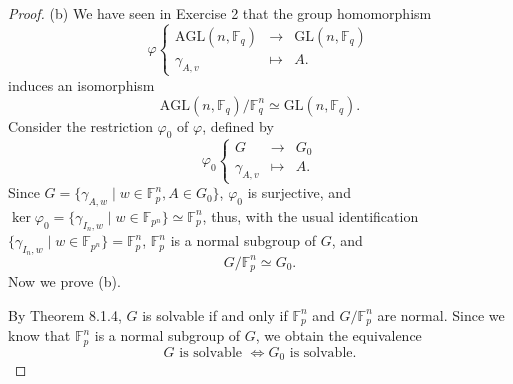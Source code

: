\documentclass[11pt,a4paper]{article}
\newcommand{\F}{\mathbb{F}}
\begin{document}
\begin{proof}
  \item[(b)] We have seen in Exercise 2 that the group homomorphism
  $$
\varphi
\left\{
\begin{array}{ccc}
\mathrm{AGL}(n,\F_q) & \to &\mathrm{GL}(n,\F_q)\\
\gamma_{A,v} & \mapsto &A.
\end{array}
\right.
$$
induces an isomorphism 
$$\mathrm{AGL}(n,\F_q)/ \F_q^n \simeq \mathrm{GL}(n,\F_q).$$
Consider the restriction $\varphi_0$ of $\varphi$, defined by
 $$
\varphi_0
\left\{
\begin{array}{ccc}
G & \to &G_0\\
\gamma_{A,v} & \mapsto &A.
\end{array}
\right.
$$
Since $G = \{\gamma_{A,w} \mid w \in \F_p^n, A \in G_0\}$, $\varphi_0$ is surjective, and $\ker \varphi_0 = \{\gamma_{I_n,w} \mid w \in \F_{p^n}\} \simeq \F_p^n$, thus, with the usual identification $ \{\gamma_{I_n,w} \mid w \in \F_{p^n}\} = \F_p^n$, $\F_p^n$  is a normal subgroup of $G$, and
$$G/\F_p^n \simeq G_0.$$
Now we prove (b).

By Theorem 8.1.4, $G$ is solvable if and only if $\F_p^n$ and $G/\F_p^n$ are normal. Since we know that  $\F_p^n$  is a normal subgroup of $G$, we obtain the equivalence
$$G \text{ is solvable } \iff G_0 \text { is solvable.}$$
 \end{proof}
 
 
\end{document}
